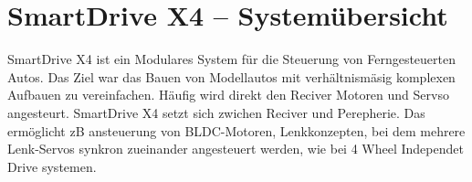 \chapter{SmartDrive X4 -- Systemübersicht}

SmartDrive X4 ist ein Modulares System für die Steuerung von Ferngesteuerten Autos. Das Ziel war das Bauen von Modellautos mit verhältnismäsig komplexen Aufbauen zu vereinfachen. Häufig wird direkt den Reciver Motoren und Servso angesteurt. SmartDrive X4 setzt sich zwichen Reciver und Perepherie. Das ermöglicht zB ansteuerung von BLDC-Motoren, Lenkkonzepten, bei dem mehrere Lenk-Servos synkron zueinander angesteuert werden, wie bei 4 Wheel Independet Drive systemen. 

